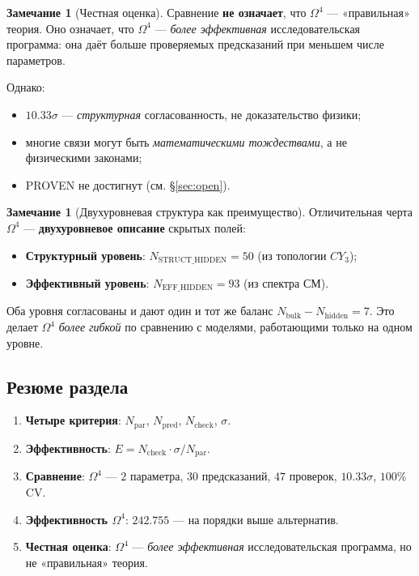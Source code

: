 \documentclass[11pt,a4paper]{article}
\newcommand{\CY}{CY_3}
\newcommand{\Om}{\Omega^4}
\theoremstyle{definition}
\newtheorem{remark}[theorem]{Замечание}
\begin{document}
\begin{remark}[Честная оценка]
\label{rem:benchmark-honest}
Сравнение \textbf{не означает}, что $\Om$ — «правильная» теория. 
Оно означает, что $\Om$ — \emph{более эффективная} 
исследовательская программа: она даёт больше проверяемых 
предсказаний при меньшем числе параметров.

\medskip\noindent
Однако:
\begin{itemize}
    \item $10.33\sigma$ — \emph{структурная} согласованность, 
          не доказательство физики;
    \item многие связи могут быть \emph{математическими 
          тождествами}, а не физическими законами;
    \item PROVEN не достигнут (см. §\ref{sec:open}).
\end{itemize}
\end{remark}

\begin{remark}[Двухуровневая структура как преимущество]
\label{rem:two-levels-advantage}
Отличительная черта $\Om$ — \textbf{двухуровневое описание}
скрытых полей:
\begin{itemize}
    \item \textbf{Структурный уровень}: $N_{\text{STRUCT\_HIDDEN}} = 50$
          (из топологии $\CY$);
    \item \textbf{Эффективный уровень}: $N_{\text{EFF\_HIDDEN}} = 93$
          (из спектра СМ).
\end{itemize}
Оба уровня согласованы и дают один и тот же баланс
$N_{\text{bulk}} - N_{\text{hidden}} = 7$.
Это делает $\Om$ \emph{более гибкой} по сравнению с моделями,
работающими только на одном уровне.
\end{remark}

\subsection{Резюме раздела}
\label{subsec:benchmark-summary}

\begin{enumerate}
    \item \textbf{Четыре критерия}: $N_{\text{par}}$, 
          $N_{\text{pred}}$, $N_{\text{check}}$, $\sigma$.
    \item \textbf{Эффективность}: $E = N_{\text{check}} \cdot 
          \sigma / N_{\text{par}}$.
    \item \textbf{Сравнение}: $\Om$ — $2$ параметра, 
          $30$ предсказаний, $47$ проверок, $10.33\sigma$, 
          $100\%$ CV.
    \item \textbf{Эффективность $\Om$}: $242.755$ — на порядки 
          выше альтернатив.
    \item \textbf{Честная оценка}: $\Om$ — \emph{более эффективная} 
          исследовательская программа, но не «правильная» теория.
\end{enumerate}
\end{document}
